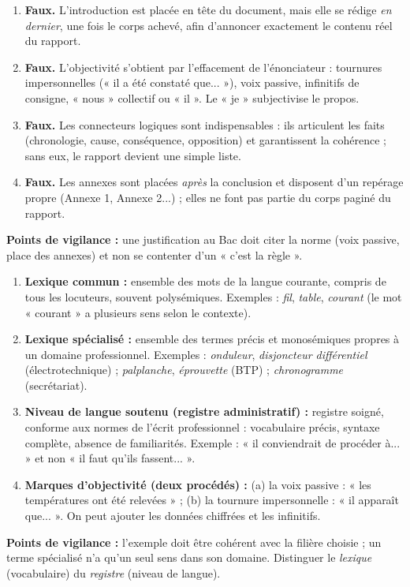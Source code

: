 \documentclass[11pt]{article}
\begin{document}
\begin{corrige}
\begin{enumerate}
\item \textbf{Faux.} L'introduction est placée en tête du document, mais elle se rédige \emph{en dernier}, une fois le corps achevé, afin d'annoncer exactement le contenu réel du rapport.
\item \textbf{Faux.} L'objectivité s'obtient par l'effacement de l'énonciateur : tournures impersonnelles (« il a été constaté que... »), voix passive, infinitifs de consigne, « nous » collectif ou « il ». Le « je » subjectivise le propos.
\item \textbf{Faux.} Les connecteurs logiques sont indispensables : ils articulent les faits (chronologie, cause, conséquence, opposition) et garantissent la cohérence ; sans eux, le rapport devient une simple liste.
\item \textbf{Faux.} Les annexes sont placées \emph{après} la conclusion et disposent d'un repérage propre (Annexe 1, Annexe 2...) ; elles ne font pas partie du corps paginé du rapport.
\end{enumerate}
\textbf{Points de vigilance :} une justification au Bac doit citer la norme (voix passive, place des annexes) et non se contenter d'un « c'est la règle ».
\end{corrige}

\begin{corrige}
\begin{enumerate}
\item \textbf{Lexique commun :} ensemble des mots de la langue courante, compris de tous les locuteurs, souvent polysémiques. Exemples : \emph{fil}, \emph{table}, \emph{courant} (le mot « courant » a plusieurs sens selon le contexte).
\item \textbf{Lexique spécialisé :} ensemble des termes précis et monosémiques propres à un domaine professionnel. Exemples : \emph{onduleur}, \emph{disjoncteur différentiel} (électrotechnique) ; \emph{palplanche}, \emph{éprouvette} (BTP) ; \emph{chronogramme} (secrétariat).
\item \textbf{Niveau de langue soutenu (registre administratif) :} registre soigné, conforme aux normes de l'écrit professionnel : vocabulaire précis, syntaxe complète, absence de familiarités. Exemple : « il conviendrait de procéder à... » et non « il faut qu'ils fassent... ».
\item \textbf{Marques d'objectivité (deux procédés) :} (a) la voix passive : « les températures ont été relevées » ; (b) la tournure impersonnelle : « il apparaît que... ». On peut ajouter les données chiffrées et les infinitifs.
\end{enumerate}
\textbf{Points de vigilance :} l'exemple doit être cohérent avec la filière choisie ; un terme spécialisé n'a qu'un seul sens dans son domaine. Distinguer le \emph{lexique} (vocabulaire) du \emph{registre} (niveau de langue).
\end{corrige}
\end{document}
